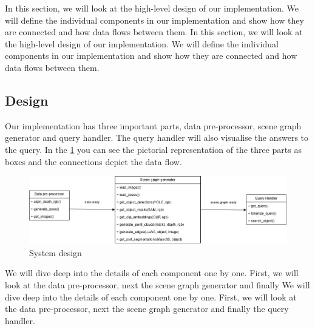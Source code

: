 In this section, we will look at the high-level design of our implementation. We will define the individual components in our
implementation and show how they are connected and how data flows between them.
In this section, we will look at the high-level design of our implementation. We will define the individual components in our
implementation and show how they are connected and how data flows between them.

\subsection{Design}
Our implementation has three important parts, data pre-processor, scene graph generator and query handler. The query handler will also visualise
the answers to the query. In the \cref{fig:system_desgin} you can see the pictorial representation of the three parts as boxes and the connections depict the data flow.
\begin{figure}[ht!]
    \centering
    \includegraphics[width=\textwidth]{content/images/Design.png}
    \caption{System design}
    \label{fig:system_desgin}
\end{figure}

We will dive deep into the details of each component one by one. First, we will look at the data pre-processor, next the scene graph generator and finally 
We will dive deep into the details of each component one by one. First, we will look at the data pre-processor, next the scene graph generator and finally 
the query handler.

